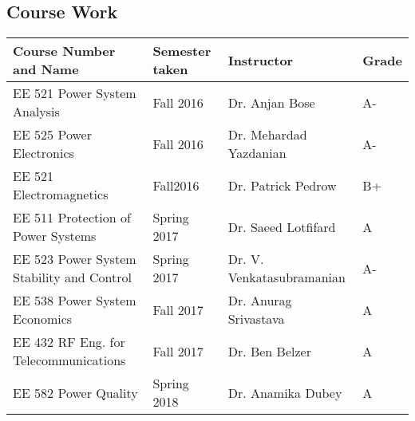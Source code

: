 \documentclass[12pt]{article}
\begin{document}
\subsection{Course Work}


	\begin{table}[h]
	\small
	\begin{tabular}{l|l|l|l}
		\toprule
		\hline
		Course Number and Name & Semester taken& Instructor& Grade\\
		\hline
		EE 521 Power System Analysis& Fall 2016& Dr. Anjan Bose& A-\\
		EE 525 Power Electronics& Fall 2016& Dr. Mehardad Yazdanian& A-\\
		EE 521 Electromagnetics&  Fall2016& Dr. Patrick Pedrow& B+\\
		EE 511 Protection of Power Systems& Spring 2017& Dr. Saeed Lotfifard& A\\
		EE 523 Power System Stability and Control& Spring 2017& Dr. V. Venkatasubramanian& A-\\
		EE 538 Power System Economics& Fall 2017& Dr. Anurag Srivastava& A\\
		EE 432 RF Eng. for Telecommunications& Fall 2017& Dr. Ben Belzer& A\\
		EE 582 Power Quality& Spring 2018& Dr. Anamika Dubey& A\\
		\toprule
	\end{tabular}
	\vspace{-10 pt}
\end{table}


\newpage


% 

\end{document}
